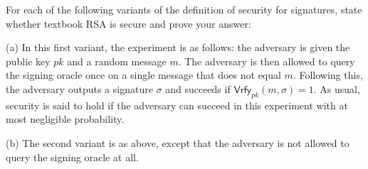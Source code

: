 \documentclass[12pt,letterpaper,boxed]{amspset}
\begin{document}






\begin{problem}[12.2]
For each of the following variants of the definition of security for signatures, state whether textbook RSA is secure and prove your answer: 
\end{problem}

\begin{solution}
(a) In this first variant, the experiment is as follows: the adversary is given the public key $pk$ and a random message $m$. The adversary is then allowed to query the signing oracle once on a single message that does not equal $m$. Following this, the adversary outputs a signature $\sigma$ and succeeds if $\mathsf{Vrfy}_{pk}(m,\sigma)=1$. As usual, security is said to hold if the adversary can succeed in this experiment with at most negligible probability.	
\vspace{5cm}

\noindent (b) The second variant is as above, except that the adversary is not allowed to query the signing oracle at all.
\vspace{4cm}

\end{solution}
\end{document}
